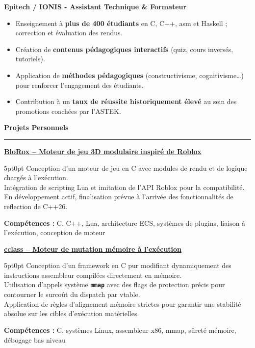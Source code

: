 \documentclass[9pt]{extarticle}
\begin{document}
{\bfseries Epitech / IONIS - Assistant Technique \& Formateur}
\begin{itemize}[noitemsep, topsep=0pt]
	\item Enseignement à {\bfseries plus de 400 étudiants} en C, C++, asm et Haskell ; correction et évaluation des rendus.
	\item Création de {\bfseries contenus pédagogiques interactifs} (quiz, cours inversés, tutoriels).
	\item Application de {\bfseries méthodes pédagogiques} (constructivisme, cognitivisme…) pour renforcer l'engagement des étudiants.
	\item Contribution à un {\bfseries taux de réussite historiquement élevé} au sein des promotions coachées par l'ASTEK.
\end{itemize}

\par\vspace{5pt}


{\large\bfseries Projets Personnels}
\par\vspace{-8pt}
\rule{\linewidth}{0.4pt}
\par\vspace{5pt}

\underline{\bfseries \href{https://github.com/paulogarithm/blorox}{BloRox} -- Moteur de jeu 3D modulaire inspiré de Roblox}
\par
\begin{adjustwidth}{5pt}{0pt}
	Conception d'un moteur de jeu en C avec modules de rendu et de logique chargés à l'exécution. \\
	Intégration de scripting Lua et imitation de l'API Roblox pour la compatibilité. \\
	En développement actif, finalisation prévue à l'arrivée des fonctionnalités de reflection de C++26.
\end{adjustwidth}
\par
{\bfseries Compétences :} C, C++, Lua, architecture ECS, systèmes de plugins, liaison à l'exécution, conception de moteur

\par\vspace{8pt}

\underline{\bfseries \href{https://github.com/paulogarithm/cclass}{cclass} -- Moteur de mutation mémoire à l'exécution}
\par
\begin{adjustwidth}{5pt}{0pt}
    Conception d'un framework en C pur modifiant dynamiquement des instructions assembleur compilées directement en mémoire. \\
    Utilisation d'appels système {\bfseries \texttt{mmap}} avec des flags de protection précis pour contourner le surcoût du dispatch par vtable. \\
    Application de règles d'alignement mémoire strictes pour garantir une stabilité absolue sur les cibles d'exécution matérielles.
\end{adjustwidth}
\par
{\bfseries Compétences :} C, systèmes Linux, assembleur x86, mmap, sûreté mémoire, débogage bas niveau
\end{document}
